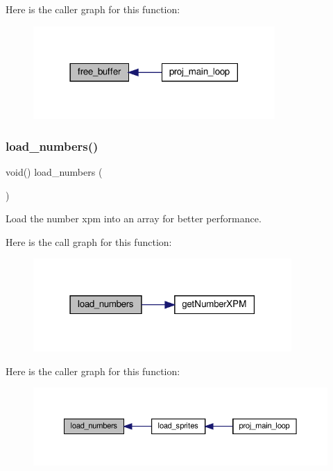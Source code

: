 Here is the caller graph for this function\+:
\nopagebreak
\begin{figure}[H]
\begin{center}
\leavevmode
\includegraphics[width=261pt]{group__graphics_ga427099c53976d605666e7e2b39238bb9_icgraph}
\end{center}
\end{figure}
\mbox{\label{group__graphics_gad93c2188e33c696ab1697dc05b320131}} 
\subsubsection{\texorpdfstring{load\+\_\+numbers()}{load\_numbers()}}
{\footnotesize\ttfamily void() load\+\_\+numbers (\begin{DoxyParamCaption}{ }\end{DoxyParamCaption})}



Load the number xpm into an array for better performance. 

Here is the call graph for this function\+:
\nopagebreak
\begin{figure}[H]
\begin{center}
\leavevmode
\includegraphics[width=279pt]{group__graphics_gad93c2188e33c696ab1697dc05b320131_cgraph}
\end{center}
\end{figure}
Here is the caller graph for this function\+:
\nopagebreak
\begin{figure}[H]
\begin{center}
\leavevmode
\includegraphics[width=350pt]{group__graphics_gad93c2188e33c696ab1697dc05b320131_icgraph}
\end{center}
\end{figure}
\mbox{\label{group__graphics_ga1677f4b59f9e0584d82e0b655e4b7fc9}} 
